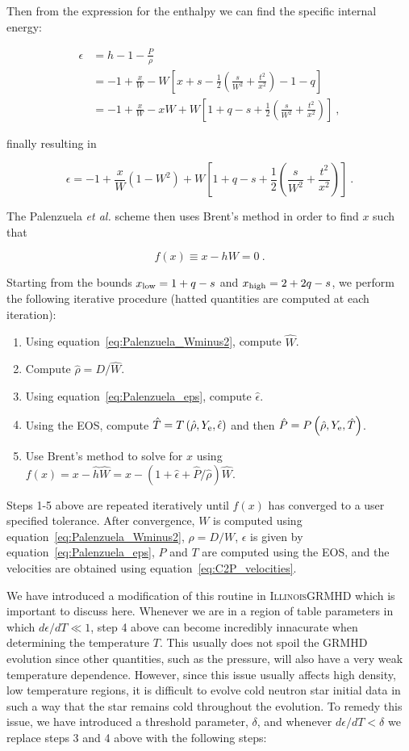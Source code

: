\documentclass{article}
\newcommand{\igm}{\textsc{IllinoisGRMHD}\xspace}
\newcommand{\ye}{Y_{\rm e}}
\newcommand{\etal}{\textit{et al.}\xspace}
\newcommand{\eq}[1]{
\begin{equation}
    #1
\end{equation}
}
\newcommand{\spl}[1]{
\eq{
\begin{split}
    #1
\end{split}
}
}
\begin{document}
\noindent Then from the expression for the enthalpy we can find the specific internal energy:

\spl{
  \epsilon &= h - 1 - \frac{P}{\rho}\\
  &= - 1 + \frac{x}{W} - W\left[x + s - \frac{1}{2}\left(\frac{s}{W^{2}} + \frac{t^{2}}{x^{2}}\right) - 1 - q\right]\\
  &= - 1 + \frac{x}{W} - xW + W\left[1 + q - s + \frac{1}{2}\left(\frac{s}{W^{2}} + \frac{t^{2}}{x^{2}}\right)\right]\ ,
}

\noindent finally resulting in

\eq{
  \boxed{ \epsilon = - 1 + \frac{x}{W}\left(1 - W^{2}\right) + W\left[1 + q - s + \frac{1}{2}\left(\frac{s}{W^{2}} + \frac{t^{2}}{x^{2}}\right)\right] }\ .\label{eq:Palenzuela_eps}
}

The Palenzuela \etal scheme then uses Brent's method in order to find $x$ such that

\eq{ f(x) \equiv x - h W = 0 \ .}

\noindent Starting from the bounds $x_{\rm low} = 1+q-s$ and $x_{\rm high} = 2+2q-s$, we perform the following iterative procedure (hatted quantities are computed at each iteration):

\begin{enumerate}
\item Using equation~\eqref{eq:Palenzuela_Wminus2}, compute $\hat{W}$.
\item Compute $\hat{\rho} = D/\hat{W}$.
\item Using equation~\eqref{eq:Palenzuela_eps}, compute $\hat{\epsilon}$.
\item Using the EOS, compute $\hat{T}=T\left(\hat{\rho},\ye,\hat{\epsilon}\right)$ and then $\hat{P}=P\left(\hat{\rho},\ye,\hat{T}\right)$.
\item Use Brent's method to solve for $x$ using $f(x) = x - \hat{h}\hat{W} = x - \left(1 + \hat{\epsilon} + \hat{P}/\hat{\rho}\right)\hat{W}$.
\end{enumerate}

Steps 1-5 above are repeated iteratively until $f(x)$ has converged to a user specified tolerance. After convergence, $W$ is computed using equation~\eqref{eq:Palenzuela_Wminus2}, $\rho = D/W$, $\epsilon$ is given by equation~\eqref{eq:Palenzuela_eps}, $P$ and $T$ are computed using the EOS, and the velocities are obtained using equation~\eqref{eq:C2P_velocities}.

We have introduced a modification of this routine in \igm which is important to discuss here. Whenever we are in a region of table parameters in which $d\epsilon/dT \ll 1$, step 4 above can become incredibly innacurate when determining the temperature $T$. This usually does not spoil the GRMHD evolution since other quantities, such as the pressure, will also have a very weak temperature dependence. However, since this issue usually affects high density, low temperature regions, it is difficult to evolve cold neutron star initial data in such a way that the star remains cold throughout the evolution. To remedy this issue, we have introduced a threshold parameter, $\delta$, and whenever $d\epsilon/dT < \delta$ we replace steps 3 and 4 above with the following steps:
\end{document}

